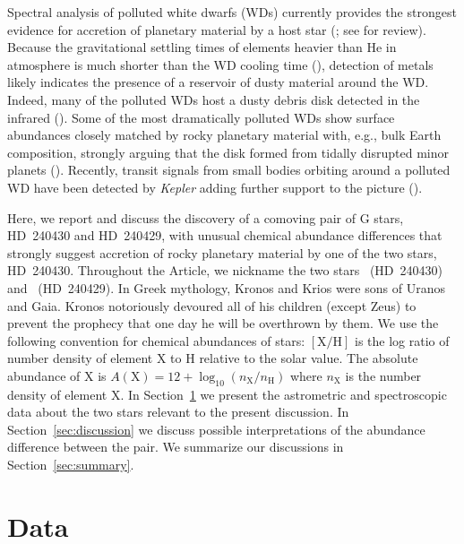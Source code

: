 \documentclass[modern, letterpaper]{aastex61}
\newcommand{\project}[1]{\textsl{#1}}
\newcommand{\documentname}{Article}
\newcommand{\sectionname}{Section}
\newcommand*\elem[1]{\ensuremath{\mathrm{#1}}}
\newcommand*\elemH[1]{\ensuremath{[\mathrm{#1}/\elem{H}]}}
\newcommand{\sunanalog}{\text{Krios}}
\newcommand{\bizarreone}{\text{Kronos}}
\begin{document}
Spectral analysis of polluted white dwarfs (WDs) currently provides the
strongest evidence for accretion of planetary material by a host star
(\citealt{2003ApJ...596..477Z,2010ApJ...722..725Z,2014A&A...566A..34K};
see \citealt{2016NewAR..71....9F} for review).
Because the gravitational settling times of elements heavier than \elem{He} in
atmosphere is much shorter than the WD cooling time
(\citealt{1986ApJS...61..197P}), detection of metals likely indicates the
presence of a reservoir of dusty material around the WD.
Indeed, many of the polluted WDs host a dusty debris disk detected in the
infrared (\citealt{1987Natur.330..138Z,1990ApJ...357..216G,2005ApJ...635L.161R,
  2009ApJ...694..805F,2006ApJ...646..474K}).
Some of the most dramatically polluted WDs show
surface abundances closely matched by rocky planetary material
with, e.g., bulk Earth composition, strongly arguing
that the disk formed from tidally disrupted minor planets
(\citealt{Zuckerman:2007aa,Klein:2010aa}).
Recently, transit signals from small bodies orbiting around a polluted WD
have been detected by \project{Kepler} adding further support to the picture
(\citealt{2015Natur.526..546V}).

Here, we report and discuss the discovery of a comoving pair of G stars,
HD~240430 and HD~240429, with unusual chemical abundance differences that
strongly suggest accretion of rocky planetary material by one of the two stars,
HD~240430.
Throughout the \documentname, we nickname the two stars \bizarreone\
(HD~240430) and \sunanalog\ (HD~240429).
In Greek mythology, Kronos and Krios were sons of Uranos and Gaia.
Kronos notoriously devoured all of his children (except Zeus)
to prevent the prophecy that one day he will be overthrown by them.
We use the following convention for chemical abundances of stars: \elemH{X} is
the log ratio of number density of element \elem{X} to \elem{H} relative to the
solar value.
The absolute abundance of \elem{X} is $A(\elem{X}) = 12 + \log_{10}
(n_\elem{X}/n_\elem{H})$ where $n_\elem{X}$ is the number density of element
\elem{X}.
In \sectionname~\ref{sec:data} we present the astrometric and spectroscopic data
about the two stars relevant to the present discussion.
In \sectionname~\ref{sec:discussion} we discuss possible interpretations of the
abundance difference between the pair.
We summarize our discussions in \sectionname~\ref{sec:summary}.


\section{Data}
\label{sec:data}
\end{document}
